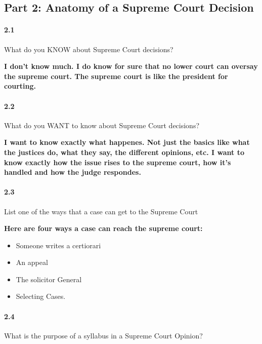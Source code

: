 \subsection{Part 2: Anatomy of a Supreme Court Decision}


\paragraph{2.1} What do you KNOW about Supreme Court decisions?

\bf{I don't know much. I do know for sure that no lower court can oversay the
supreme court. The supreme court is like the president for courting.}


\paragraph{2.2} What do you WANT to know about Supreme Court decisions?

\bf{I want to know exactly what happenes. Not just the basics like what the
justices do, what they say, the different opinions, etc. I want to know exactly
how the issue rises to the supreme court, how it's handled and how the judge
respondes.}


\paragraph{2.3} List one of the ways that a case can get to the Supreme Court

\bf{Here are four ways a case can reach the supreme court:}

\begin{itemize}
  \item Someone writes a certiorari
  \item An appeal
  \item The solicitor General
  \item Selecting Cases.
\end{itemize}


\paragraph{2.4} What is the purpose of a syllabus in a Supreme Court Opinion?

